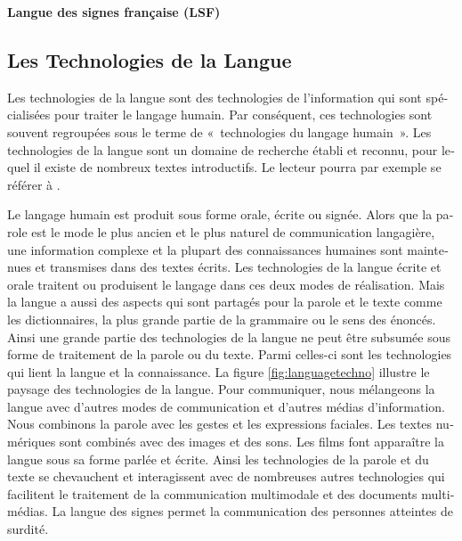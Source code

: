 \begin{french}
\begin{multicols}{2}
{\bf Langue des signes française (LSF)}\\

\end{multicols}

\clearpage


\begin{multicols}{2}

\subsection{Les Technologies de la Langue}

Les technologies de la langue sont des technologies de l'information
qui sont spécialisées pour traiter le langage humain. Par conséquent,
ces technologies sont souvent regroupées sous le terme de «~technologies
du langage humain~». Les technologies de la langue sont un domaine de recherche \'etabli et reconnu, pour lequel il existe de nombreux textes introductifs. Le lecteur pourra par exemple se r\'ef\'erer \`a \cite{hltsurvey96} \cite{varile1997survey}.

Le langage humain est produit sous forme orale,
écrite ou signée. Alors que la parole est le mode le plus ancien et le
plus naturel de communication langagière, une information complexe et
la plupart des connaissances humaines sont maintenues et transmises
dans des textes écrits. Les technologies de la langue écrite et orale
traitent ou produisent le langage dans ces deux modes de
réalisation. Mais la langue a aussi des aspects qui sont partagés pour
la parole et le texte comme les dictionnaires, la plus grande partie
de la grammaire ou le sens des énoncés. Ainsi une grande partie des
technologies de la langue ne peut être subsumée sous forme de
traitement de la parole ou du texte. Parmi celles-ci sont les
technologies qui lient la langue et la connaissance. La figure
\ref{fig:languagetechno} illustre le paysage des technologies de la
langue. Pour communiquer, nous mélangeons la langue avec d'autres
modes de communication et d'autres médias d'information. Nous
combinons la parole avec les gestes et les expressions faciales. Les
textes numériques sont combinés avec des images et des sons. Les films
font apparaître la langue sous sa forme parlée et écrite. Ainsi les
technologies de la parole et du texte se chevauchent et interagissent
avec de nombreuses autres technologies qui facilitent le traitement de
la communication multimodale et des documents multimédias.  La langue
des signes permet la communication des personnes atteintes de surdité.


\end{multicols}
\end{french}
